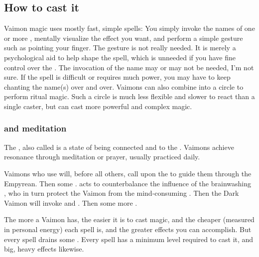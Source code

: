 \subsection{How to cast it}
Vaimon magic uses mostly fast, simple  spells: 
You simply invoke the names of one or more \Archons, mentally visualize the effect you want, and perform a simple gesture such as pointing your finger. 
The gesture is not really needed. 
It is merely a psychological aid to help shape the spell, which is unneeded if you have fine control over the \Archons. 
The invocation of the name may or may not be needed, I'm not sure. If the spell is difficult or requires much power, you may have to keep chanting the name(s) over and over. 
Vaimons can also combine into a circle to perform ritual magic. Such a circle is much less flexible and slower to react than a single caster, but can cast more powerful and complex magic. 





\subsubsection{\Shechinah{} and meditation}
\index{\shechinah}
The \shechinah, also called  is a state of being connected and  to the \Archons. 
Vaimons achieve resonance through meditation or prayer, usually practiced daily. 

Vaimons who use \Itzach{} will, before all others, call upon the \qliphah{}  to guide them through the Empyrean. 
Then some \sephiroth. 
\KorRashad{} acts to counterbalance the influence of the brainwashing \sephiroth{}, who in turn protect the Vaimon from the mind-consuming \qliphoth. 
Then the Dark Vaimon will invoke  and . 
Then some more \Archons. 

The more \shechinah{} a Vaimon has, the easier it is to cast magic, and the cheaper (measured in personal energy) each spell is, and the greater effects you can accomplish. 
But every spell drains some \shechinah. 
Every spell has a minimum \shechinah{} level required to cast it, and big, heavy effects likewise. 

